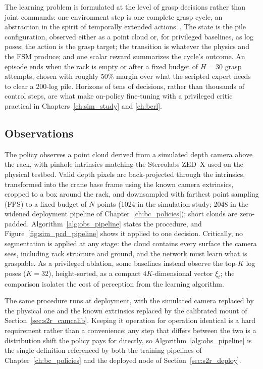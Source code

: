 The learning problem is formulated at the level of grasp decisions rather
than joint commands: one environment step is one complete grasp cycle, an
abstraction in the spirit of temporally extended
actions~\cite{sutton1999between}. The state is the pile configuration,
observed either as a point cloud or, for privileged baselines, as log poses;
the action is the grasp target; the transition is whatever the physics and
the FSM produce; and one scalar reward summarizes the cycle's outcome. An
episode ends when the rack is empty or after a fixed budget of $H = 30$ grasp
attempts, chosen with roughly 50\% margin over what the scripted expert needs
to clear a 200-log pile. Horizons of tens of decisions, rather than
thousands of control steps, are what make on-policy fine-tuning with a
privileged critic practical in Chapters~\ref{ch:sim_study} and \ref{ch:bcrl}.

\subsection{Observations}
\label{sec:sim_obs}

The policy observes a point cloud derived from a simulated depth camera
above the rack, with pinhole intrinsics matching the Stereolabs ZED~X used on
the physical testbed. Valid depth pixels are back-projected through the
intrinsics, transformed into the crane base frame using the known camera
extrinsics, cropped to a box around the rack, and downsampled with farthest
point sampling (FPS) to a fixed budget of $N$ points (1024 in the simulation
study; 2048 in the widened deployment pipeline of
Chapter~\ref{ch:bc_policies}); short clouds are zero-padded.
Algorithm~\ref{alg:obs_pipeline} states the procedure, and
Figure~\ref{fig:sim_pcd_pipeline} shows it applied to one decision.
Critically, no segmentation is applied at any stage: the cloud contains every
surface the camera sees, including rack structure and ground, and the
network must learn what is graspable. As a privileged ablation, some
baselines instead observe the top-$K$ log poses ($K = 32$), height-sorted, as
a compact $4K$-dimensional vector $\xi_t$; the comparison isolates the cost of
perception from the learning algorithm.

The same procedure runs at deployment, with the simulated camera replaced by
the physical one and the known extrinsics replaced by the calibrated mount of
Section~\ref{sec:s2r_camcalib}. Keeping it operation for operation identical
is a hard requirement rather than a convenience: any step that differs
between the two is a distribution shift the policy pays for directly, so
Algorithm~\ref{alg:obs_pipeline} is the single definition referenced by both
the training pipelines of Chapter~\ref{ch:bc_policies} and the deployed node
of Section~\ref{sec:s2r_deploy}.

